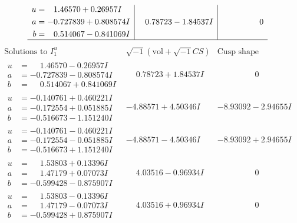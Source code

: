 \documentclass[1p]{elsarticle_modified}
\theoremstyle{definition}
\newcommand{\I}{\sqrt{-1}}
\begin{document}
$$\begin{array}{c|c|c}
\begin{aligned}
u &= \phantom{-}1.46570 + 0.26957 I \\
a &= -0.727839 + 0.808574 I \\
b &= \phantom{-}0.514067 - 0.841069 I\end{aligned}
 & \phantom{-}0.78723 - 1.84537 I & \phantom{-0.000000 } 0\\
 \hline 
 \end{array}$$\newpage$$\begin{array}{c|c|c}  
\text{Solutions to }I^u_{1}& \I (\text{vol} + \sqrt{-1}CS) & \text{Cusp shape}\\
 \hline 
\begin{aligned}
u &= \phantom{-}1.46570 - 0.26957 I \\
a &= -0.727839 - 0.808574 I \\
b &= \phantom{-}0.514067 + 0.841069 I\end{aligned}
 & \phantom{-}0.78723 + 1.84537 I & \phantom{-0.000000 } 0 \\ \hline\begin{aligned}
u &= -0.140761 + 0.460221 I \\
a &= -0.172554 + 0.051885 I \\
b &= -0.516673 - 1.151240 I\end{aligned}
 & -4.88571 + 4.50346 I & -8.93092 - 2.94655 I \\ \hline\begin{aligned}
u &= -0.140761 - 0.460221 I \\
a &= -0.172554 - 0.051885 I \\
b &= -0.516673 + 1.151240 I\end{aligned}
 & -4.88571 - 4.50346 I & -8.93092 + 2.94655 I \\ \hline\begin{aligned}
u &= \phantom{-}1.53803 + 0.13396 I \\
a &= \phantom{-}1.47179 + 0.07073 I \\
b &= -0.599428 - 0.875907 I\end{aligned}
 & \phantom{-}4.03516 - 0.96934 I & \phantom{-0.000000 } 0 \\ \hline\begin{aligned}
u &= \phantom{-}1.53803 - 0.13396 I \\
a &= \phantom{-}1.47179 - 0.07073 I \\
b &= -0.599428 + 0.875907 I\end{aligned}
 & \phantom{-}4.03516 + 0.96934 I & \phantom{-0.000000 } 0 \\ \hline\begin{aligned}

\end{aligned}
\end{array}$$
\end{document}
